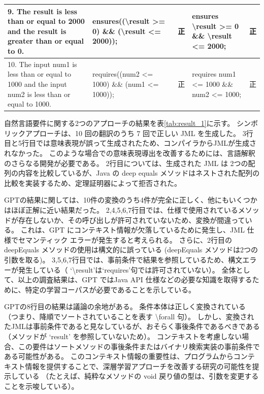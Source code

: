 \documentclass[uplatex, twocolumn,10pt]{jsarticle} %
\begin{document}
\begin{table}[t]
\begin{tabular}{p{25mm}|p{45mm}|p{7mm}|p{45mm}|p{7mm}}
        9. The result is less than or equal to 2000 and the result is greater than or equal to 0.          & ensures((\textbackslash result \textgreater= 0) \&\& (\textbackslash result \textless= 2000));                                                                                                                  & 正                                                                    & ensures \textbackslash result \textgreater= 0 \&\& \textbackslash result \textless= 2000;                                              & 正    \\ \hline
        10. The input num1 is less than or equal to 1000 and the input num2 is less than or equal to 1000. & requires((num2 \textless= 1000) \&\& (num1 \textless= 1000));                                                                                                                                                   & 正                                                                    & requires num1 \textless= 1000 \&\& num2 \textless= 1000;                                                                               & 正    \\ \hline
    \end{tabular}
\end{table}

自然言語要件に関する2つのアプローチの結果を表\ref{tab:result_1}に示す。
シンボリックアプローチは、10 回の翻訳のうち 7 回で正しい JML を生成した。
3行目と5行目では意味表現が誤って生成されたため、コンパイラからJMLが生成されなかった。
このような場合での意味表現導出を改善するためには、言語解釈のさらなる開発が必要である。
2行目については、生成された JML は 2つの配列の内容を比較しているが、Java の deep equals メソッドはネストされた配列の比較を実装するため、定理証明器によって拒否された。

GPTの結果に関しては、10件の変換のうち4件が完全に正しく、他にもいくつかはほぼ正解に近い結果だった。
2,4,5,6,7行目では、仕様で使用されているメソッドが存在しないか、その呼び出しが許可されていないため、変換が間違っている。
これは、GPT にコンテキスト情報が欠落しているために発生し、JML 仕様でセマンティック エラーが発生すると考えられる。
さらに、2行目の deepEquals メソッドの使用は構文的に誤っている (deepEquals メソッドは2つの引数を取る)。
3,5,6,7行目では、事前条件で結果を参照しているため、構文エラーが発生している（ `\textbackslash result'は`requires'句では許可されていない）。
全体として、以上の調査結果は、GPT ではJava API 仕様などの必要な知識を取得するために、特定の学習コーパスが必要であることを示している。

GPTの8行目の結果は議論の余地がある。
条件本体は正しく変換されている （つまり、降順でソートされていることを表す \textbackslash forall 句）。
しかし、変換されたJMLは事前条件であると見なしているが、おそらく事後条件であるべきである（メソッドが `result' を参照していないため）。
コンテキストを考慮しない場合、この要件はソートメソッドの事後条件またはバイナリ検索実装の事前条件である可能性がある。
このコンテキスト情報の重要性は、プログラムからコンテキスト情報を提供することで、深層学習アプローチを改善する研究の可能性を提示している
（たとえば、純粋なメソッドの void 戻り値の型は、引数を変更することを示唆している）。
\end{document}
